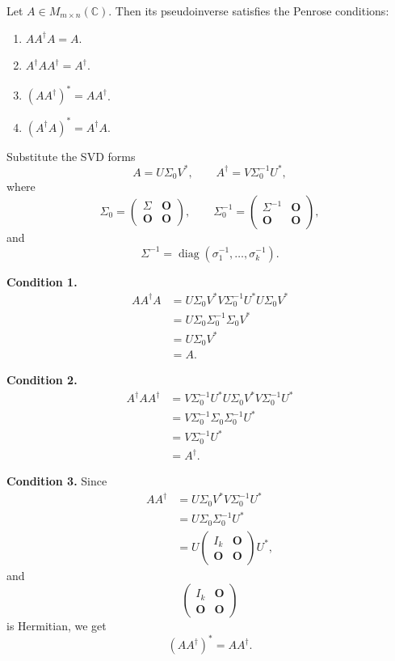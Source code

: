 \begin{theorem}[Penrose]
Let $A\in M_{m\times n}(\mathbb{C})$.
Then its pseudoinverse satisfies the Penrose conditions:
\begin{enumerate}
    \item $AA^\dagger A=A$.
    \item $A^\dagger AA^\dagger=A^\dagger$.
    \item $(AA^\dagger)^*=AA^\dagger$.
    \item $(A^\dagger A)^*=A^\dagger A$.
\end{enumerate}
\end{theorem}

\begin{pfbox}
Substitute the SVD forms
\[
A
=
U\Sigma_0V^*,
\qquad
A^\dagger
=
V\Sigma_0^{-1}U^*,
\]
where
\[
\Sigma_0
=
\begin{pmatrix}
\Sigma & \mathbf{O} \\
\mathbf{O} & \mathbf{O}
\end{pmatrix},
\qquad
\Sigma_0^{-1}
=
\begin{pmatrix}
\Sigma^{-1} & \mathbf{O} \\
\mathbf{O} & \mathbf{O}
\end{pmatrix},
\]
and
\[
\Sigma^{-1}
=
\operatorname{diag}
(\sigma_1^{-1},\ldots,\sigma_k^{-1}).
\]

\textbf{Condition 1.}
\begin{align*}
AA^\dagger A
&=
U\Sigma_0V^*
V\Sigma_0^{-1}U^*
U\Sigma_0V^* \\
&=
U\Sigma_0\Sigma_0^{-1}\Sigma_0V^* \\
&=
U\Sigma_0V^* \\
&=
A.
\end{align*}

\textbf{Condition 2.}
\begin{align*}
A^\dagger AA^\dagger
&=
V\Sigma_0^{-1}U^*
U\Sigma_0V^*
V\Sigma_0^{-1}U^* \\
&=
V\Sigma_0^{-1}\Sigma_0\Sigma_0^{-1}U^* \\
&=
V\Sigma_0^{-1}U^* \\
&=
A^\dagger.
\end{align*}

\textbf{Condition 3.}
Since
\begin{align*}
AA^\dagger
&=
U\Sigma_0V^*
V\Sigma_0^{-1}U^* \\
&=
U\Sigma_0\Sigma_0^{-1}U^* \\
&=
U
\begin{pmatrix}
I_k & \mathbf{O} \\
\mathbf{O} & \mathbf{O}
\end{pmatrix}
U^*,
\end{align*}
and
\[
\begin{pmatrix}
I_k & \mathbf{O} \\
\mathbf{O} & \mathbf{O}
\end{pmatrix}
\]
is Hermitian, we get
\[
(AA^\dagger)^*
=
AA^\dagger.
\]


\end{pfbox}

